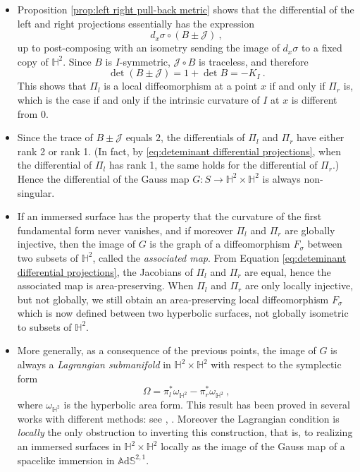 \documentclass[10pt,a4paper,oneside,reqno]{book}
\def\H{\mathbb{H}}
\def\A{\mathbb{A}\mathrm{d}\mathbb{S}}
\newcommand{\I}{I}
\newcommand{\JJ}{\mathcal{J}\!}
\theoremstyle{plain}
\theoremstyle{definition}
\theoremstyle{plain}
\theoremstyle{plain}
\theoremstyle{mystyleNormalFont}
\begin{document}
\begin{itemize}[leftmargin=0.5cm]
\item Proposition \ref{prop:left right pull-back metric} shows that the differential of the left and right projections essentially has the expression 
\[
    d_x\sigma\circ(B\pm\JJ)~,
\]
up to post-composing with an isometry sending the image of $d_x\sigma$ to a fixed copy of $\H^2$. Since $B$ is $\I$-symmetric, $\JJ\circ B$ is traceless, and therefore 
\begin{equation}\label{eq:deteminant differential projections}
\det(B\pm\JJ)=1+\det B=-K_\I~.
\end{equation}
This shows that $\Pi_l$ is a local diffeomorphism at a point $x$ if and only if $\Pi_r$ is, which is the case if and only if the intrinsic curvature of $\I$ at $x$ is different from $0$.
\item Since the trace of $B\pm\JJ$ equals $2$, the differentials of $\Pi_l$ and $\Pi_r$ have either rank 2 or rank 1. (In fact, by \eqref{eq:deteminant differential projections}, when the differential of $\Pi_l$ has rank 1, the same holds for the differential of $\Pi_r$.) Hence the differential of the Gauss map $G:S\to\H^2\times\H^2$ is always non-singular.
\item If an immersed surface has the property that the curvature of the first fundamental form never vanishes, and if moreover $\Pi_l$ and $\Pi_r$ are globally injective, then the image of $G$ is the graph of a  diffeomorphism $F_\sigma$ between two subsets of $\H^2$,  called the \emph{associated map}. From Equation \eqref{eq:deteminant differential projections}, the Jacobians of $\Pi_l$ and $\Pi_r$ are equal, hence the associated map is area-preserving.
When $\Pi_l$ and $\Pi_r$ are only locally injective, but not globally, we still obtain an area-preserving local diffeomorphism $F_\sigma$ which is now defined between two hyperbolic surfaces, not globally isometric to subsets of $\H^2$.
\item More generally, as a consequence of the previous points, the image of $G$ is always a \emph{Lagrangian submanifold} in $\H^2\times\H^2$ with respect to the symplectic form 
\begin{equation} \label{eq symplectic form}
\Omega=\pi_l^*\omega_{\H^2}-\pi_r^*\omega_{\H^2}~,
\end{equation}
where $\omega_{\H^2}$ is the hyperbolic area form. 
This result has been proved in several works with different methods: see \cite{bonsante2017equivariant}, \cite{Seppi_2017}. Moreover the Lagrangian condition is \emph{locally} the only obstruction to inverting this construction, that is, to realizing an immersed surfaces in $\H^2\times\H^2$ locally as the image of the Gauss map of a spacelike immersion in $\A^{2,1}$.

\end{itemize}
\end{document}
